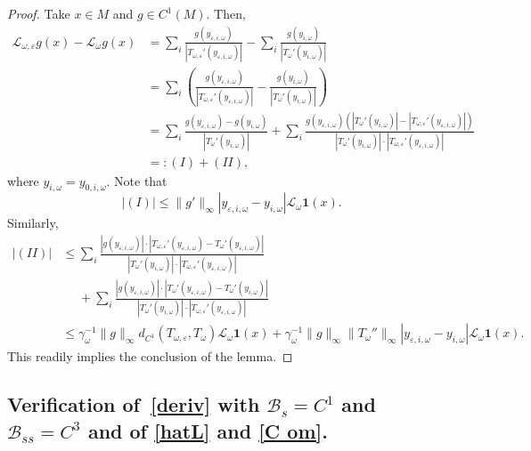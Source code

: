 \documentclass[11pt,reqno,a4paper]{article}
\theoremstyle{special}
\renewcommand{\epsilon}{\varepsilon}
\renewcommand{\L}{\mathcal{L}}
\def\B{\mathcal{B}}
\def\om{\omega}
\begin{document}
\begin{proof}
Take $x \in M$ and $g\in C^1(M)$. Then,
\[
\begin{split}
\L_{\omega, \epsilon}g(x)-\L_\omega g(x) &=\sum_i \frac{g(y_{\epsilon, i, \omega})}{|T_{\omega, \epsilon}'(y_{\epsilon, i, \omega})|}-\sum_i
\frac{g(y_{i, \omega})}{|T_\omega'(y_{i, \omega})|} \\
&=\sum_i\left (\frac{g(y_{\epsilon, i, \omega})}{|T_{\omega, \epsilon}'(y_{\epsilon, i, \omega})|}-
\frac{g(y_{i, \omega})}{|T_\omega'(y_{i, \omega})|}  \right ) \\
&=\sum_i \frac{g(y_{\epsilon, i, \omega})-g(y_{i, \omega})}{|T_{\omega}'(y_{i, \omega})|}+\sum_i  \frac{g(y_{\epsilon, i, \omega})(|T_\omega'(y_{i, \omega})|-|T_{\omega, \epsilon}'(y_{\epsilon, i, \omega})|)}{|T_\omega'(y_{i, \omega})| \cdot |T_{\omega, \epsilon}'(y_{\epsilon, i, \omega})|} \\
&=:(I)+(II),
\end{split}
\]
where $y_{i, \om}=y_{0, i, \om}$.
Note that 
\[
|(I)| \le \|g'\|_\infty |y_{\epsilon, i, \omega}-y_{i, \omega}|\L_\omega \mathbf 1(x).
\]
Similarly, 
\[
\begin{split}
|(II)| &\le \sum_i \frac{|g(y_{\epsilon, i, \omega})|\cdot |T_{\omega, \epsilon}'(y_{\epsilon, i, \omega})-T_\omega'(y_{\epsilon, i, \omega})|}{|T_\omega'(y_{i, \omega})| \cdot |T_{\omega, \epsilon}'(y_{\epsilon, i, \omega})|} \\
&\phantom{=}+\sum_i\frac{|g(y_{\epsilon, i, \omega})|\cdot |T_{\omega}'(y_{\epsilon, i, \omega})-T_\omega'(y_{ i, \omega})|}{|T_\omega'(y_{i, \omega})| \cdot |T_{\omega, \epsilon}'(y_{\epsilon, i, \omega})|} \\
&\le \gamma_\omega^{-1}\|g\|_\infty d_{C^1} (T_{\omega, \epsilon}, T_\omega)\L_\omega \mathbf 1(x)+\gamma_\omega^{-1}\|g\|_\infty \|T_\omega''\|_\infty |y_{\epsilon, i, \omega}- y_{i, \omega}|\L_\omega \mathbf 1(x).
\end{split}
\]
This readily implies the conclusion of the lemma.
\end{proof} 



\subsection{Verification of~\eqref{deriv} with $\B_s=C^1$ and $\B_{ss}=C^3$ and  of \eqref{hatL} and \eqref{C om}.}
\end{document}
